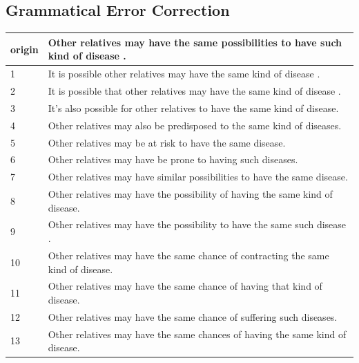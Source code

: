 \documentclass[letterpaper, 11pt]{article}
\begin{document}
\subsection{Grammatical Error Correction}
\begin{table}[]
	\centering
	\begin{tabular}{ll}
		\cline{1-1}
		\multicolumn{1}{|l|}{origin} & Other relatives may have the same possibilities to have such kind of disease .        \\ \hline
		1                            & It is possible other relatives may have the same kind of disease .                    \\
		2                            & It is possible that other relatives may have the same kind of disease .               \\
		3                            & It's also possible for other relatives to have the same kind of disease.              \\
		4                            & Other relatives may also be predisposed to the same kind of diseases.                 \\
		5                            & Other relatives may be at risk to have the same disease.                              \\
		6                            & Other relatives may have be prone to having such diseases.                            \\
		7                            & Other relatives may have similar possibilities to have the same disease.              \\
		8                            & Other relatives may have the possibility of having the same kind of disease.          \\
		9                            & Other relatives may have the possibility to have the same such disease .              \\
		10                           & Other relatives may have the same chance of contracting the same kind of disease.     \\
		11                           & Other relatives may have the same chance of having that kind of disease.              \\
		12                           & Other relatives may have the same chance of suffering such diseases.                  \\
		13                           & Other relatives may have the same chances of having the same kind of disease.         \\

\end{tabular}
\end{table}
\end{document}
